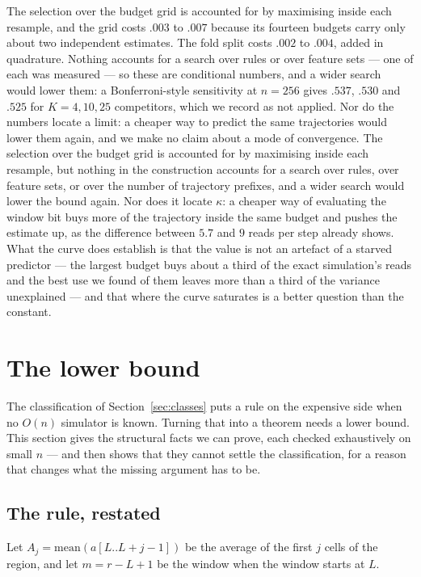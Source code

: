 \documentclass[11pt]{article}
\begin{document}
The selection over the budget grid is accounted for by maximising inside each resample, and the grid
costs $.003$ to $.007$ because its fourteen budgets carry only about two independent estimates. The
fold split costs $.002$ to $.004$, added in quadrature. Nothing accounts for a search over rules or
over feature sets --- one of each was measured --- so these are conditional numbers, and a wider
search would lower them: a Bonferroni-style sensitivity at $n=256$ gives $.537$, $.530$ and $.525$ for
$K=4,10,25$ competitors, which we record as not applied. Nor do the numbers locate a limit: a cheaper way
to predict the same trajectories would lower them again, and we make no claim about a mode of
convergence.
The selection over the budget grid is accounted for by maximising inside each resample, but nothing
in the construction accounts for a search over rules, over feature sets, or over the number of
trajectory prefixes, and a wider search would lower the bound again. Nor does it locate $\kappa$: a cheaper way
of evaluating the window bit buys more of the trajectory inside the same budget and pushes the estimate
up, as the difference between $5.7$ and $9$ reads per step already shows. What the curve does establish
is that the value is not an artefact of a starved predictor --- the largest budget buys about a third of
the exact simulation's reads and the best use we found of them leaves more than a third of the variance
unexplained --- and that where the curve saturates is a better question than the constant.

\section{The lower bound}
\label{sec:lower}

The classification of Section~\ref{sec:classes} puts a rule on the expensive side when no $O(n)$
simulator is known. Turning that into a theorem needs a lower bound. This section gives the structural
facts we can prove, each checked exhaustively on small $n$ --- and then shows that they
cannot settle the classification, for a reason that changes what the missing argument has to be.

\subsection*{The rule, restated}

Let $A_j=\mathrm{mean}(a[L..L+j-1])$ be the average of the first $j$ cells of the region, and let
$m=r-L+1$ be the window when the window starts at $L$.
\end{document}

